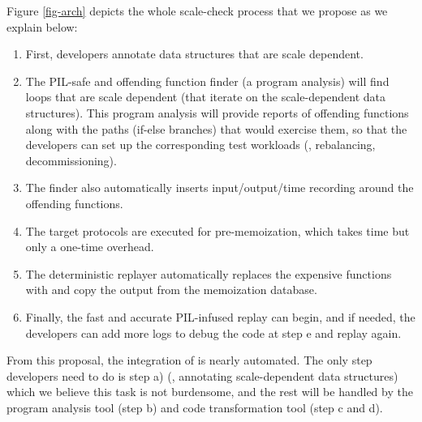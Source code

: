 Figure \ref{fig-arch} depicts the whole scale-check process that we propose as
we explain below:
%
\begin{enumerate}[label=(\alph*)]

\item First, developers annotate data structures that are scale dependent.
%
\item The PIL-safe and offending function finder (a program analysis) will find
loops that are scale dependent (that iterate on the scale-dependent data
structures). This program analysis will provide reports of offending functions
along with the paths (if-else branches) that would exercise them, so that the
developers can set up the corresponding test workloads (\eg, rebalancing,
decommissioning).
%
\item The finder also automatically inserts input/output/time recording around
the offending functions.
%
\item The target protocols are executed for pre-memoization, which takes time
but only a one-time overhead.
%
\item The deterministic replayer automatically replaces the expensive functions
with  and copy the output from the memoization database.
%
\item Finally, the fast and accurate PIL-infused replay can begin, and if
needed, the developers can add more logs to debug the code at step e and replay
again.

\end{enumerate}

From this proposal, the integration of \sck is nearly automated. The only step
developers need to do is step a) (\ie, annotating scale-dependent data
structures) which we believe this task is not burdensome, and the rest will be
handled by the program analysis tool (step b) and code transformation tool (step
c and d).
